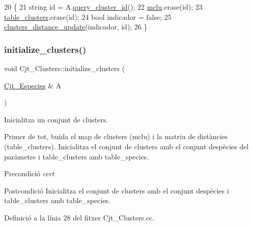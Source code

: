 \begin{DoxyCode}
20                                           \{
21     \textcolor{keywordtype}{string} \textcolor{keywordtype}{id} = A.\hyperlink{class_cluster_a7e077596f7eb4f2bdf2847d65fa37654}{query\_cluster\_id}();
22     \hyperlink{class_cjt___clusters_a5f5e13255bca1fac2ad65c51473f6ead}{mclu}.erase(\textcolor{keywordtype}{id});
23     \hyperlink{class_cjt___clusters_a6af3fcf70683cdb88f137f6f51002939}{table\_clusters}.erase(\textcolor{keywordtype}{id});
24     \textcolor{keywordtype}{bool} indicador = \textcolor{keyword}{false};
25     \hyperlink{class_cjt___clusters_ad794d3d1b0df7adb7fbb35d21634f5a0}{clusters\_distance\_update}(indicador, \textcolor{keywordtype}{id});
26 \}
\end{DoxyCode}
\mbox{\label{class_cjt___clusters_a35d2c4c28bee51017f4ac9049a0fe6e9}} 
\subsubsection{\texorpdfstring{initialize\+\_\+clusters()}{initialize\_clusters()}}
{\footnotesize\ttfamily void Cjt\+\_\+\+Clusters\+::initialize\+\_\+clusters (\begin{DoxyParamCaption}\item[{\hyperlink{class_cjt___especies}{Cjt\+\_\+\+Especies} \&}]{A }\end{DoxyParamCaption})}



Inicialitza un conjunt de clusters. 

Primer de tot, buida el map de clusters (mclu) i la matriu de distàncies (table\+\_\+clusters). Inicialitza el conjunt de clusters amb el conjunt d\textquotesingle{}espècies del paràmetre i table\+\_\+clusters amb table\+\_\+species.

\begin{DoxyPrecond}{Precondició}
{\itshape cert} 
\end{DoxyPrecond}
\begin{DoxyPostcond}{Postcondició}
Inicialitza el conjunt de clusters amb el conjunt d\textquotesingle{}espècies i table\+\_\+clusters amb table\+\_\+species. 
\end{DoxyPostcond}


Definició a la línia 28 del fitxer Cjt\+\_\+\+Clusters.\+cc.


